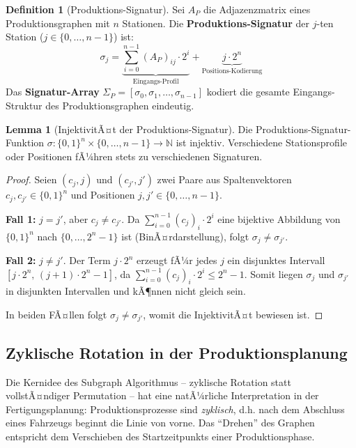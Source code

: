 ﻿\documentclass[a4paper,12pt]{article}
\theoremstyle{definition}
\newtheorem{definition}{Definition}
\newtheorem{lemma}{Lemma}
\begin{document}
\begin{definition}[Produktions-Signatur]
\label{def:signatur}
Sei $A_P$ die Adjazenzmatrix eines Produktionsgraphen mit $n$ Stationen.
Die \textbf{Produktions-Signatur} der $j$-ten Station ($j \in \{0,\ldots,n-1\}$) ist:
\[
\sigma_j = \underbrace{\sum_{i=0}^{n-1} (A_P)_{ij} \cdot 2^i}_{\text{Eingangs-Profil}} + \underbrace{j \cdot 2^n}_{\text{Positions-Kodierung}}
\]
Das \textbf{Signatur-Array} $\Sigma_P = [\sigma_0, \sigma_1, \ldots, \sigma_{n-1}]$ kodiert
die gesamte Eingangs-Struktur des Produktionsgraphen eindeutig.
\end{definition}

\begin{lemma}[InjektivitÃ¤t der Produktions-Signatur]
\label{lem:injektivitaet}
Die Produktions-Signatur-Funktion $\sigma: \{0,1\}^n \times \{0,\ldots,n-1\} \to \mathbb{N}$
ist injektiv. Verschiedene Stationsprofile oder Positionen fÃ¼hren stets zu verschiedenen Signaturen.
\end{lemma}

\begin{proof}
Seien $(c_j, j)$ und $(c_{j'}, j')$ zwei Paare aus Spaltenvektoren $c_j, c_{j'} \in \{0,1\}^n$
und Positionen $j, j' \in \{0,\ldots,n-1\}$.

\textbf{Fall 1:} $j = j'$, aber $c_j \neq c_{j'}$. Da $\sum_{i=0}^{n-1} (c_j)_i \cdot 2^i$
eine bijektive Abbildung von $\{0,1\}^n$ nach $\{0,\ldots,2^n-1\}$ ist (BinÃ¤rdarstellung),
folgt $\sigma_j \neq \sigma_{j'}$.

\textbf{Fall 2:} $j \neq j'$. Der Term $j \cdot 2^n$ erzeugt fÃ¼r jedes $j$ ein disjunktes Intervall
$[j \cdot 2^n,\, (j+1) \cdot 2^n - 1]$, da $\sum_{i=0}^{n-1} (c_j)_i \cdot 2^i \leq 2^n - 1$.
Somit liegen $\sigma_j$ und $\sigma_{j'}$ in disjunkten Intervallen und kÃ¶nnen nicht gleich sein.

In beiden FÃ¤llen folgt $\sigma_j \neq \sigma_{j'}$, womit die InjektivitÃ¤t bewiesen ist.
\end{proof}

\subsection{Zyklische Rotation in der Produktionsplanung}

Die Kernidee des Subgraph Algorithmus -- zyklische Rotation statt vollstÃ¤ndiger Permutation --
hat eine natÃ¼rliche Interpretation in der Fertigungsplanung: Produktionsprozesse sind
\emph{zyklisch}, d.h. nach dem Abschluss eines Fahrzeugs beginnt die Linie von vorne.
Das ``Drehen'' des Graphen entspricht dem Verschieben des Startzeitpunkts einer Produktionsphase.
\end{document}
